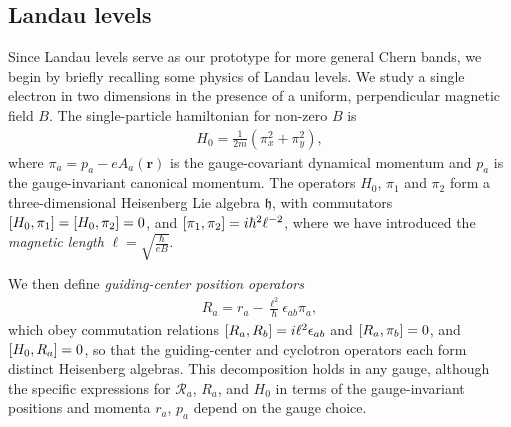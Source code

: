 \documentclass[aps,prb,twocolumn,letterpaper,twoside,nobalancelastpage,groupedaddress,amsmath,amssymb,floatfix,citeautoscript]{revtex4-1}
\begin{document}
\subsection{Landau levels}
\label{landau-level-review}
Since Landau levels serve as our prototype for more general Chern bands, we begin by briefly recalling some physics of Landau levels\cite{yoshioka_quantum_2002}. We study a single electron in two dimensions in the presence of a uniform, perpendicular magnetic field $B$. The single-particle hamiltonian for non-zero $B$ is
\begin{align}
\label{landau-hamiltonian}
H_0 = \frac{1}{2m}\left(\pi_x^2 + \pi_y^2\right),
\end{align}
where $\pi_a = p_a - e A_a(\mathbf{r})$ is the gauge-covariant dynamical momentum and $p_a$ is the gauge-invariant canonical momentum. The operators $H_0$, $\pi_1$ and $\pi_2$ form a three-dimensional Heisenberg Lie algebra $\mathfrak{h}$, with commutators $\comm{H_0}{\pi_1} = \comm{H_0}{\pi_2} = 0$, and $\comm{\pi_1}{\pi_2} = i\hbar^2\ell^{-2}$, where we have introduced the \textit{magnetic length} $\ell = \sqrt{\frac{\hbar}{eB}}.$


We then define \textit{guiding-center position operators}
\begin{align*}
R_a = r_a - \frac{\ell^2}{\hbar}\epsilon_{ab}\pi_a,
\end{align*}
which obey commutation relations $\comm{R_a}{R_b} = i\ell^2 \epsilon_{ab}$ and $\comm{R_a}{\pi_b} = 0$, and $\comm{H_0}{R_a} = 0$, so that the guiding-center and cyclotron operators each form distinct Heisenberg algebras. This decomposition holds in any gauge, although the specific expressions for $\mathcal{R}_a$, $R_a$, and $H_0$ in terms of the gauge-invariant positions and momenta $r_a$, $p_a$ depend on the gauge choice.

\end{document}

